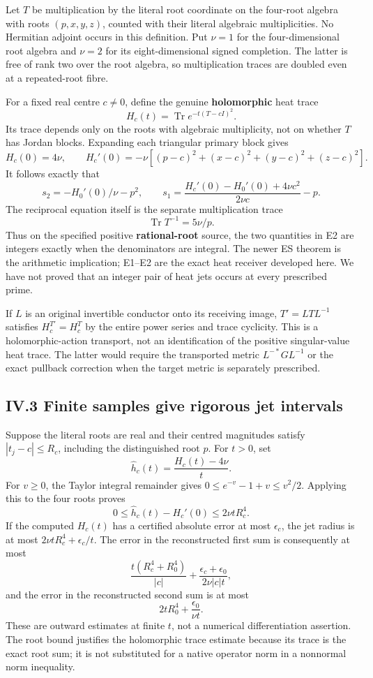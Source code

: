 \documentclass[11pt]{article}
\begin{document}
Let \(T\) be multiplication by the literal root coordinate on the four-root algebra with roots \((p,x,y,z)\), counted with their literal algebraic multiplicities. No Hermitian adjoint occurs in this definition. Put \(\nu=1\) for the four-dimensional root algebra and \(\nu=2\) for its eight-dimensional signed completion. The latter is free of rank two over the root algebra, so multiplication traces are doubled even at a repeated-root fibre.

For a fixed real centre \(c\ne0\), define the genuine \textbf{holomorphic} heat trace \[
 H_c(t)=\operatorname{Tr}e^{-t(T-cI)^2}.
 \tag{E1}
\] Its trace depends only on the roots with algebraic multiplicity, not on whether \(T\) has Jordan blocks. Expanding each triangular primary block gives \[
 H_c(0)=4\nu,\qquad
 H_c'(0)=-\nu\left[(p-c)^2+(x-c)^2+(y-c)^2+(z-c)^2\right].
\] It follows exactly that \[
 \boxed{s_2=-H_0'(0)/\nu-p^2,\qquad
 s_1=\frac{H_c'(0)-H_0'(0)+4\nu c^2}{2\nu c}-p.}
 \tag{E2}
\] The reciprocal equation itself is the separate multiplication trace \[
 \operatorname{Tr}T^{-1}=5\nu/p.
 \tag{E3}
\] Thus on the specified positive \textbf{rational-root} source, the two quantities in E2 are integers exactly when the denominators are integral. The newer ES theorem is the arithmetic implication; E1--E2 are the exact heat receiver developed here. We have not proved that an integer pair of heat jets occurs at every prescribed prime.

If \(L\) is an original invertible conductor onto its receiving image, \(T'=LTL^{-1}\) satisfies \(H_c^{T'}=H_c^T\) by the entire power series and trace cyclicity. This is a holomorphic-action transport, not an identification of the positive singular-value heat trace. The latter would require the transported metric \(L^{-*}GL^{-1}\) or the exact pullback correction when the target metric is separately prescribed.

\subsection{IV.3 Finite samples give rigorous jet intervals}\label{iv.3-finite-samples-give-rigorous-jet-intervals}

Suppose the literal roots are real and their centred magnitudes satisfy \(|t_j-c|\le R_c\), including the distinguished root \(p\). For \(t>0\), set \[
 \widehat h_c(t)=\frac{H_c(t)-4\nu}{t}.
\] For \(v\ge0\), the Taylor integral remainder gives \(0\le e^{-v}-1+v\le v^2/2\). Applying this to the four roots proves \[
 \boxed{0\le\widehat h_c(t)-H_c'(0)\le2\nu tR_c^4.}
 \tag{E4}
\] If the computed \(H_c(t)\) has a certified absolute error at most \(\epsilon_c\), the jet radius is at most \(2\nu tR_c^4+\epsilon_c/t\). The error in the reconstructed first sum is consequently at most \[
 \boxed{\frac{t(R_c^4+R_0^4)}{|c|}
       +\frac{\epsilon_c+\epsilon_0}{2\nu|c|t},}
 \tag{E5}
\] and the error in the reconstructed second sum is at most \[
 \boxed{2tR_0^4+\frac{\epsilon_0}{\nu t}.}
 \tag{E6}
\] These are outward estimates at finite \(t\), not a numerical differentiation assertion. The root bound justifies the holomorphic trace estimate because its trace is the exact root sum; it is not substituted for a native operator norm in a nonnormal norm inequality.
\end{document}
